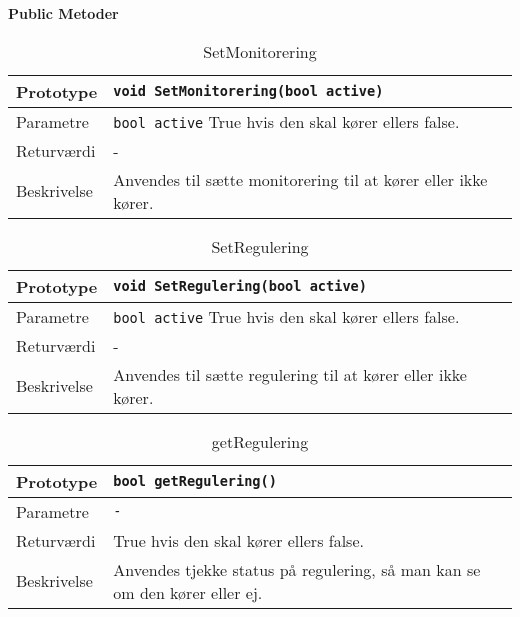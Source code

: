\textbf{Public Metoder}

\begin{table}[h]
\begin{tabularx}{\textwidth}{| >{\raggedright\arraybackslash}p{2.5 cm} | >{\raggedright\arraybackslash}X |} \hline
Prototype & \texttt{void SetMonitorering(bool active)} \\\hline
Parametre & \texttt{bool active} \newline
True hvis den skal kører ellers false. \\\hline
Returværdi & - \\\hline
Beskrivelse & Anvendes til sætte monitorering til at kører eller ikke kører. \\\hline
\end{tabularx}
\caption{SetMonitorering}
\label{table:SetMonitorering}
\end{table}

\begin{table}[h]
\begin{tabularx}{\textwidth}{| >{\raggedright\arraybackslash}p{2.5 cm} | >{\raggedright\arraybackslash}X |} \hline
Prototype & \texttt{void SetRegulering(bool active)} \\\hline
Parametre & \texttt{bool active} \newline
True hvis den skal kører ellers false. \\\hline
Returværdi & - \\\hline
Beskrivelse & Anvendes til sætte regulering til at kører eller ikke kører. \\\hline
\end{tabularx}
\caption{SetRegulering}
\label{table:SetRegulering}
\end{table}

\begin{table}[h]
\begin{tabularx}{\textwidth}{| >{\raggedright\arraybackslash}p{2.5 cm} | >{\raggedright\arraybackslash}X |} \hline
Prototype & \texttt{bool getRegulering()} \\\hline
Parametre & \texttt{-} \newline
 \\\hline
Returværdi & True hvis den skal kører ellers false. \\\hline
Beskrivelse & Anvendes tjekke status på regulering, så man kan se om den kører eller ej. \\\hline
\end{tabularx}
\caption{getRegulering}
\label{table:getRegulering}
\end{table}

